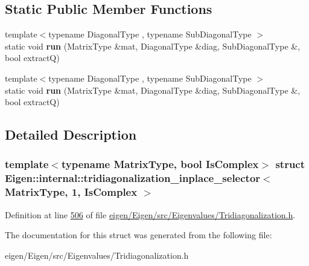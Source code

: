 \subsection*{Static Public Member Functions}
\begin{DoxyCompactItemize}
\item 
\mbox{\label{struct_eigen_1_1internal_1_1tridiagonalization__inplace__selector_3_01_matrix_type_00_011_00_01_is_complex_01_4_a8f0ab18cd3097414183e709cc22fb20e}} 
{\footnotesize template$<$typename Diagonal\+Type , typename Sub\+Diagonal\+Type $>$ }\\static void {\bfseries run} (Matrix\+Type \&mat, Diagonal\+Type \&diag, Sub\+Diagonal\+Type \&, bool extractQ)
\item 
\mbox{\label{struct_eigen_1_1internal_1_1tridiagonalization__inplace__selector_3_01_matrix_type_00_011_00_01_is_complex_01_4_a8f0ab18cd3097414183e709cc22fb20e}} 
{\footnotesize template$<$typename Diagonal\+Type , typename Sub\+Diagonal\+Type $>$ }\\static void {\bfseries run} (Matrix\+Type \&mat, Diagonal\+Type \&diag, Sub\+Diagonal\+Type \&, bool extractQ)
\end{DoxyCompactItemize}


\subsection{Detailed Description}
\subsubsection*{template$<$typename Matrix\+Type, bool Is\+Complex$>$\newline
struct Eigen\+::internal\+::tridiagonalization\+\_\+inplace\+\_\+selector$<$ Matrix\+Type, 1, Is\+Complex $>$}



Definition at line \hyperlink{eigen_2_eigen_2src_2_eigenvalues_2_tridiagonalization_8h_source_l00506}{506} of file \hyperlink{eigen_2_eigen_2src_2_eigenvalues_2_tridiagonalization_8h_source}{eigen/\+Eigen/src/\+Eigenvalues/\+Tridiagonalization.\+h}.



The documentation for this struct was generated from the following file\+:\begin{DoxyCompactItemize}
\item 
eigen/\+Eigen/src/\+Eigenvalues/\+Tridiagonalization.\+h\end{DoxyCompactItemize}
